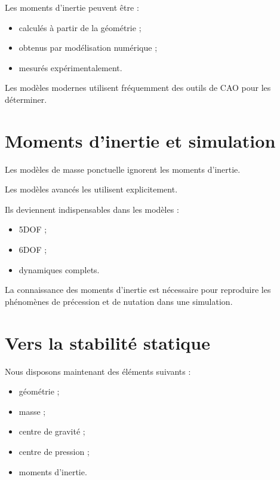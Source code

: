 Les moments d'inertie peuvent être :

\begin{itemize}
    \item calculés à partir de la géométrie ;
    \item obtenus par modélisation numérique ;
    \item mesurés expérimentalement.
\end{itemize}

Les modèles modernes utilisent fréquemment des outils de CAO pour les
déterminer.

\section{Moments d'inertie et simulation}

Les modèles de masse ponctuelle ignorent les moments d'inertie.

Les modèles avancés les utilisent explicitement.

Ils deviennent indispensables dans les modèles :

\begin{itemize}
    \item 5DOF ;
    \item 6DOF ;
    \item dynamiques complets.
\end{itemize}

\begin{simulation}

La connaissance des moments d'inertie est nécessaire pour reproduire les
phénomènes de précession et de nutation dans une simulation.

\end{simulation}

\section{Vers la stabilité statique}

Nous disposons maintenant des éléments suivants :

\begin{itemize}
    \item géométrie ;
    \item masse ;
    \item centre de gravité ;
    \item centre de pression ;
    \item moments d'inertie.
\end{itemize}

